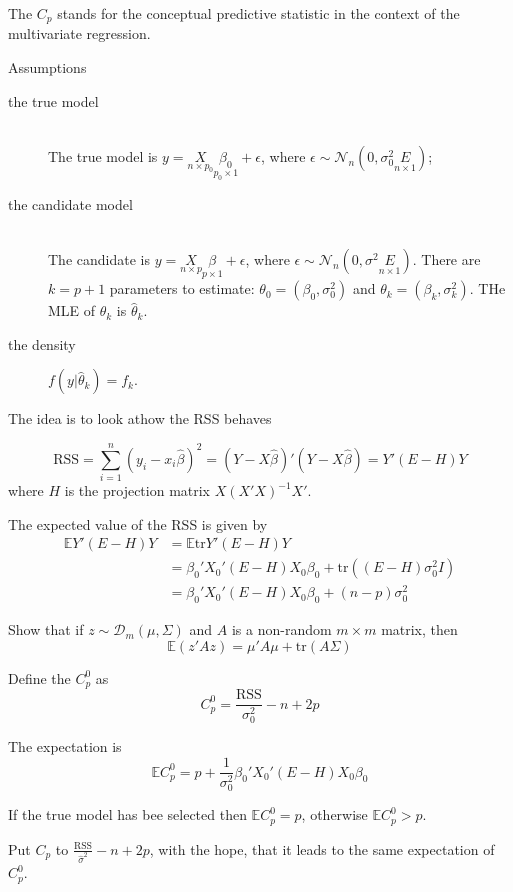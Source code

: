\documentclass[a4paper]{article}
\newcommand{\brac}[1]{{\left ( #1 \right )}}
\newcommand{\induc}[1]{{\left . #1 \right \vert}}
\newcommand{\Dcal}{\mathcal{D}}
\newcommand{\Ncal}{\mathcal{N}}
\newcommand{\Ex}[0]{{\mathbb{E}}}
\newcommand{\RSS}{{\text{RSS}}}
\newcommand{\tr}{\text{tr}}
\begin{document}
The $C_p$ stands for the conceptual predictive statistic in the context of the multivariate regression.

Assumptions \begin{description}
	\item[the true model]\hfill\\
	The true model is $y = \underset{n\times p_0}{X}\underset{p_0\times 1}{\beta_0} + \epsilon$, where $\epsilon \sim \Ncal_n\brac{0,\sigma_0^2 \underset{n\times 1}{E}}$;
	\item[the candidate model] \hfill\\
	The candidate is $y = \underset{n\times p}{X}\underset{p\times 1}{\beta} + \epsilon$, where $\epsilon \sim \Ncal_n\brac{0,\sigma^2 \underset{n\times 1}{E}}$.
	There are $k=p+1$ parameters to estimate: $\theta_0 = \brac{\beta_0,\sigma_0^2}$ and $\theta_k = \brac{\beta_k,\sigma_k^2}$. THe MLE of $\theta_k$ is $\hat{\theta}_k$.
	\item[the density] $f\brac{\induc{y}\hat{\theta}_k} = f_k$.
\end{description}

The idea is to look athow the RSS behaves

\[\RSS = \sum_{i=1}^n \brac{y_i - x_i \hat{\beta}}^2 = \brac{Y-X\hat{\beta}}'\brac{Y-X\hat{\beta}} = Y'\brac{E-H}Y\]
where $H$ is the projection matrix $X\brac{X'X}^{-1}X'$.

The expected value of the RSS is given by
\begin{align*}
	\Ex Y'\brac{E-H}Y &= \Ex\tr{Y'\brac{E-H}Y} \\
		&= \beta_0'X_0' \brac{E-H} X_0\beta_0 + \tr\brac{\brac{E-H} \sigma^2_0 I}\\
		&= \beta_0'X_0' \brac{E-H} X_0\beta_0 + (n-p)\sigma^2_0
\end{align*}

Show that if $z\sim \Dcal_m\brac{\mu,\Sigma}$ and $A$ is a non-random $m\times m$ matrix, then
\[\Ex\brac{z'Az} = \mu'A\mu + \tr\brac{A\Sigma}\] 

Define the $C_p^0$ as
\[C_p^0 = \frac{\RSS}{\sigma^2_0} - n + 2p\]

The expectation is 
\[\Ex C_p^0 = p + \frac{1}{\sigma^2_0} \beta_0'X_0' \brac{E-H} X_0\beta_0\]

If the true model has bee selected then $\Ex C_p^0 = p$, otherwise $\Ex C_p^0 > p$.

Put $C_p$ to $\frac{\RSS}{\hat{\sigma}^2} - n + 2p$, with the hope, that it leads to the same expectation of $C_p^0$.
\end{document}
